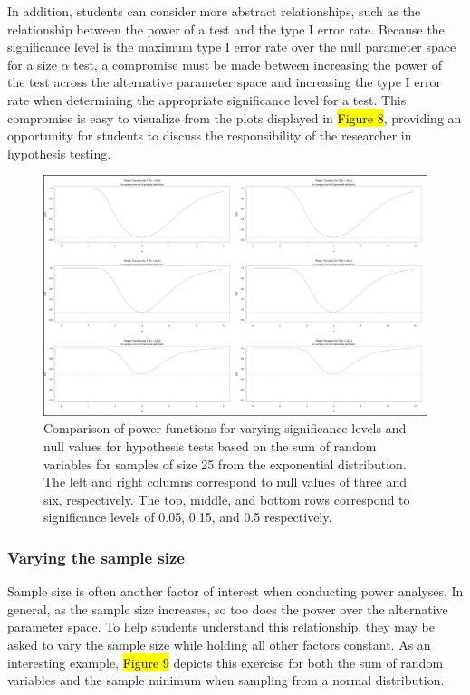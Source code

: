 \documentclass{TISE}
\begin{document}
In addition, students can consider more abstract relationships, such as the relationship between the power of a test and the type I error rate. Because the significance level is the maximum type I error rate over the null parameter space for a size $\alpha$ test, a compromise must be made between increasing the power of the test across the alternative parameter space and increasing the type I error rate when determining the appropriate significance level for a test. This compromise is easy to visualize from the plots displayed in \hl{Figure 8}, providing an opportunity for students to discuss the responsibility of the researcher in hypothesis testing.

\begin{figure}[H]
	\centering
	\includegraphics[width=\linewidth]{varyingsig.png}
	\caption{Comparison of power functions for varying significance levels and null values for hypothesis tests based on the sum of random variables for samples of size 25 from the exponential distribution. The left and right columns correspond to null values of three and six, respectively. The top, middle, and bottom rows correspond to significance levels of 0.05, 0.15, and 0.5 respectively.}
\end{figure}

\subsubsection{Varying the sample size}

Sample size is often another factor of interest when conducting power analyses. In general, as the sample size increases, so too does the power over the alternative parameter space. To help students understand this relationship, they may be asked to vary the sample size while holding all other factors constant. As an interesting example, \hl{Figure 9} depicts this exercise for both the sum of random variables and the sample minimum when sampling from a normal distribution. 
\end{document}
